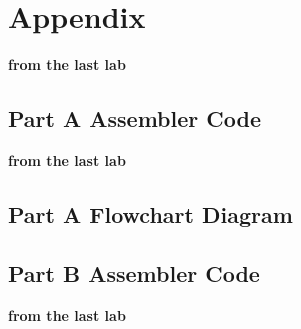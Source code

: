 \documentclass[letterpaper]{article}
\begin{document}
\newpage
\section{Appendix}
\textbf{from the last lab}
  \subsection{Part A Assembler Code}
    
\newpage
\textbf{from the last lab}
  \subsection{Part A Flowchart Diagram}
    \vspace{2cm}
    \noindent{}
\newpage
  \subsection{Part B Assembler Code}
    
\newpage
\textbf{from the last lab}
\end{document}
